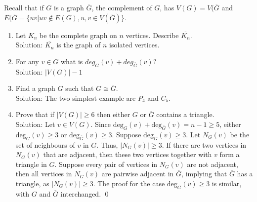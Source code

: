 \begin{enumerate}
    \newpage
     Recall that if $G$ is a graph $\overline{G}$, the complement of $G$, has $V(G)=V(\overline{G}$ and $E(\overline{G}=\{uv| uv\notin E(G), u,v\in V(\overline{G})\}$.
    \begin{enumerate}
        \item Let $K_n$ be the complete graph on $n$ vertices. Describe $\overline{K_n}$.\\
                Solution: $\overline{K_n}$ is the graph of $n$ isolated vertices.
        \item For any $v\in G$ what is $deg_G(v)+deg_{\overline{G}}(v)$?\\
                Solution: $|V(G)|-1$
        \item Find a graph $G$ such that $G\cong\overline{G}$. \\
                Solution: The two simplest example are $P_4$ and $C_5$.
        \item Prove that if $|V(G)|\geq 6$ then either $G$ or $\overline{G}$ contains a triangle.\\
                Solution: Let $v\in V(G)$. Since $\text{deg}_G(v)+\text{deg}_{\overline G}(v)=n-1\ge 5$, either $\text{deg}_G(v)\ge 3$ or $\text{deg}_{\overline G}(v)\ge 3$. Suppose $\text{deg}_G(v)\ge 3$. Let $N_G(v)$ be the set of neighbours of $v$ in $G$. Thus, $|N_G(v)|\ge 3$. If there are two vertices in $N_G(v)$ that are adjacent, then these two vertices together with $v$ form a triangle in $G$. Suppose every pair of vertices in $N_G(v)$ are not adjacent, then all vertices in $N_G(v)$ are pairwise adjacent  in ${\overline G}$, implying that ${\overline G}$ has a triangle, as $|N_G(v)|\ge 3$. The proof for the case  $\text{deg}_{\overline G}(v)\ge 3$ is similar, with $G$ and ${\overline G}$ interchanged. \qed    \end{enumerate}
\end{enumerate}